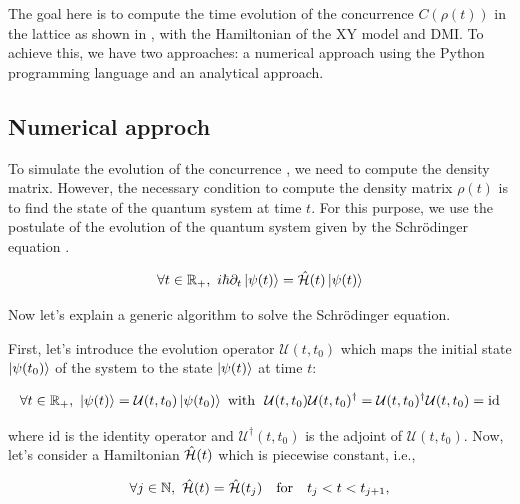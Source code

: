 
The goal here is to compute the time evolution of the concurrence \( C(\rho(t)) \) in the lattice 
as shown in , 
with the Hamiltonian of the XY model and DMI.
To achieve this, we have two approaches: a numerical approach using the Python programming language and an analytical approach.


\subsection{Numerical approch}
To simulate the evolution of the concurrence , we need to compute the 
density matrix. However, the necessary 
condition to compute the density matrix \( \rho(t) \) is to find 
the state of the quantum system at time \( t \). For this purpose, 
we use the postulate of the evolution of the quantum system given by the Schrödinger equation \cite{cohen-tannoudji_quantum_2019}. 



\begin{equation}\label{eq: Schrodinger eq}
    \forall t \in \mathbb{R}_+, \ i \hbar \partial_t \ket{\psi(t)} = \hat{\mathcal{H}}(t) \ket{\psi (t)} 
\end{equation}

Now let's explain a generic algorithm to solve the Schrödinger equation.

First, let's introduce the evolution operator \( \mathcal{U}(t, t_0) \) which maps the initial state 
\( \ket{\psi(t_0)} \) of 
the system to the state \( \ket{\psi(t)} \) at time \( t \):  

\begin{equation}\label{def : evolution operator}
   \forall t \in \mathbb{R}_+, \ \ket{\psi(t)} = \mathcal{U}(t,t_0)  \ket{\psi(t_0)} 
   \text{ with  } \ \mathcal{U}(t,t_0) \mathcal{U}(t,t_0)^\dagger = \mathcal{U}(t,t_0)^\dagger \mathcal{U}(t,t_0) = \text{id}  
\end{equation}

where \( \text{id} \) is the identity operator and \( \mathcal{U}^\dagger(t, t_0) \) is the adjoint of \( \mathcal{U}(t, t_0) \).
Now, let's consider a Hamiltonian \( \hat{\mathcal{H}}(t) \) which is piecewise constant, i.e.,



\begin{equation}\label{prop: hypothese Hamiltionan}
    \forall j \in \mathbb{N}, \  \hat{\mathcal{H}}(t) = \hat{\mathcal{H}}(t_j) \quad \text{for} \quad t_j < t < t_{j+1},     
\end{equation}

